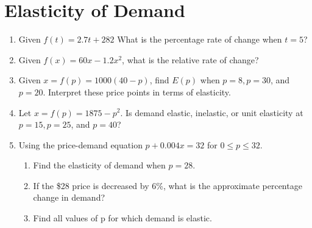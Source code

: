 \documentclass[14pt]{extarticle}
\begin{document}
\section{Elasticity of Demand}

	\begin{enumerate}
	\item Given $f(t) = 2.7t+282$ What is the percentage rate of change when $t=5$?
	\vspace{3cm}
	
	\item Given $f(x) = 60x- 1.2x^2$, what is the relative rate of change?
	\vspace{3cm}
			
	\item Given $x=f(p)=1000(40-p)$, find $E(p)$ when $p=8, p=30$, and $p=20$. Interpret these price points in terms of elasticity.
	\vspace{3cm}
	
	\item Let $x = f(p) =1875-p^2$. Is demand elastic, inelastic, or unit elasticity at $p=15, p=25$, and $p=40$?
	\vspace{3cm}
	
	\item Using the price-demand equation $p+0.004x = 32$ for $0 \leq p \leq 32$. 
	\begin{enumerate}
		\item Find the elasticity of demand when $p = 28$.
		\item If the \$28 price is decreased by 6\%, what is the approximate percentage change in demand?
		\item Find all values of p for which demand is elastic.
	\end{enumerate} 
	
\end{enumerate}


\cleardoublepage
\end{document}

